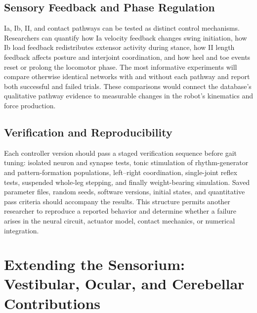 \subsection{Sensory Feedback and Phase Regulation}

\begin{reviewchange}
Ia, Ib, II, and contact pathways can be tested as distinct control mechanisms. Researchers can quantify how Ia velocity feedback changes swing initiation, how Ib load feedback redistributes extensor activity during stance, how II length feedback affects posture and interjoint coordination, and how heel and toe events reset or prolong the locomotor phase. The most informative experiments will compare otherwise identical networks with and without each pathway and report both successful and failed trials. These comparisons would connect the database's qualitative pathway evidence to measurable changes in the robot's kinematics and force production.
\end{reviewchange}

\subsection{Verification and Reproducibility}

\begin{reviewchange}
Each controller version should pass a staged verification sequence before gait tuning: isolated neuron and synapse tests, tonic stimulation of rhythm-generator and pattern-formation populations, left--right coordination, single-joint reflex tests, suspended whole-leg stepping, and finally weight-bearing simulation. Saved parameter files, random seeds, software versions, initial states, and quantitative pass criteria should accompany the results. This structure permits another researcher to reproduce a reported behavior and determine whether a failure arises in the neural circuit, actuator model, contact mechanics, or numerical integration.
\end{reviewchange}

\section{Extending the Sensorium: Vestibular, Ocular, and Cerebellar Contributions}\label{sec:fw_senses}

